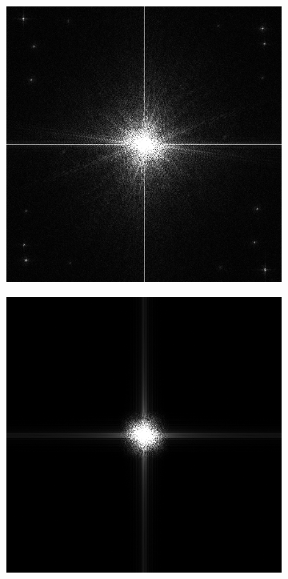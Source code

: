 \begin{figure}[htbp]
\begin{subfigure}[t]{0.2\textwidth}
  \end{subfigure}%
  \hspace*{0.02\textwidth}
  \begin{subfigure}[t]{0.2\textwidth}
    \centering
    \includegraphics[width=\textwidth]{figs/method/fourier/peppers_fourier.png}
  \end{subfigure}%
  \hspace*{0.02\textwidth}
  \begin{subfigure}[t]{0.2\textwidth}
    \centering
    \includegraphics[width=\textwidth]{figs/method/fourier/peppers_blur_fourier.png}

\end{subfigure}
\end{figure}
